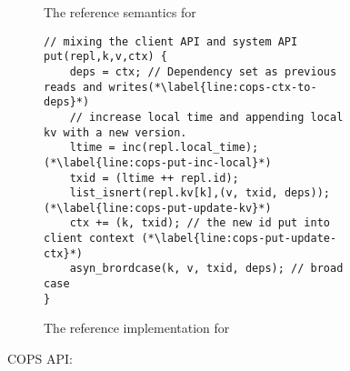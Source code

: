 \begin{figure}
\begin{subfigure}{\textwidth}
\begin{mathpar}
\end{mathpar}

\caption{The reference semantics for \pcopsput}
\label{fig:cops-semantics-write}
\end{subfigure}

\hrulefill

\begin{subfigure}{\textwidth}
\begin{lstlisting}
// mixing the client API and system API
put(repl,k,v,ctx) {
    deps = ctx; // Dependency set as previous reads and writes(*\label{line:cops-ctx-to-deps}*) 
    // increase local time and appending local kv with a new version.
    ltime = inc(repl.local_time);(*\label{line:cops-put-inc-local}*) 
    txid = (ltime ++ repl.id);
    list_isnert(repl.kv[k],(v, txid, deps));(*\label{line:cops-put-update-kv}*)
    ctx += (k, txid); // the new id put into client context (*\label{line:cops-put-update-ctx}*) 
    asyn_brordcase(k, v, txid, deps); // broad case
}
\end{lstlisting}
\caption{The reference implementation for \pcopsput}
\label{lst:cops-put}
\end{subfigure}

\hrulefill

\caption{COPS API: \pcopsput}

\end{figure}
